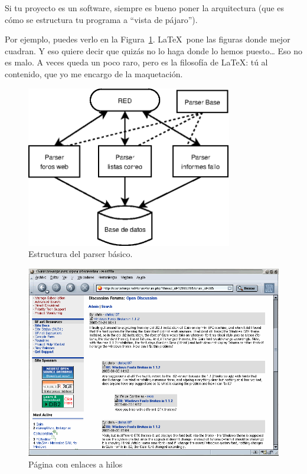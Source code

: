 \documentclass[a4paper, 12pt]{book}
\begin{document}
Si tu proyecto es un software, siempre es bueno poner la arquitectura (que es cómo se estructura tu programa a ``vista de pájaro'').

Por ejemplo, puedes verlo en la Figura~\ref{fig:arquitectura}.
\LaTeX \ pone las figuras donde mejor cuadran. 
Y eso quiere decir que quizás no lo haga donde lo hemos puesto\ldots
Eso no es malo.
A veces queda un poco raro, pero es la filosofía de \LaTeX: tú al contenido, que yo me encargo de la maquetación.

\begin{figure}
  \centering
  \includegraphics[width=9cm, keepaspectratio]{img/arquitectura.png}
  \caption{Estructura del parser básico.}\label{fig:arquitectura}
\end{figure}

\begin{figure}
    \centering
    \includegraphics[bb=0 0 800 600, width=12cm, keepaspectratio]{img/foro1}
    \caption{Página con enlaces a hilos}\label{fig:_arquitectura}
\end{figure}
\end{document}
